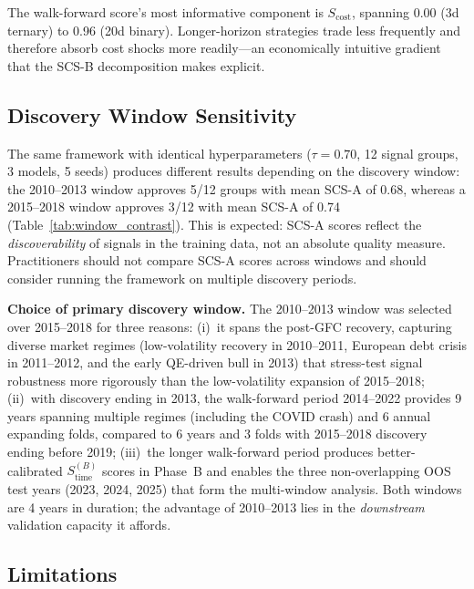 \documentclass[12pt,a4paper]{article}
\begin{document}
The walk-forward score's most informative component is $S_{\text{cost}}$, spanning 0.00 (3d ternary) to 0.96 (20d binary). Longer-horizon strategies trade less frequently and therefore absorb cost shocks more readily---an economically intuitive gradient that the SCS-B decomposition makes explicit.

\subsection{Discovery Window Sensitivity}

The same framework with identical hyperparameters ($\tau=0.70$, 12 signal groups, 3 models, 5 seeds) produces different results depending on the discovery window: the 2010--2013 window approves 5/12 groups with mean SCS-A of 0.68, whereas a 2015--2018 window approves 3/12 with mean SCS-A of 0.74 (Table~\ref{tab:window_contrast}). This is expected: SCS-A scores reflect the \emph{discoverability} of signals in the training data, not an absolute quality measure. Practitioners should not compare SCS-A scores across windows and should consider running the framework on multiple discovery periods.

\textbf{Choice of primary discovery window.} The 2010--2013 window was selected over 2015--2018 for three reasons: (i)~it spans the post-GFC recovery, capturing diverse market regimes (low-volatility recovery in 2010--2011, European debt crisis in 2011--2012, and the early QE-driven bull in 2013) that stress-test signal robustness more rigorously than the low-volatility expansion of 2015--2018; (ii)~with discovery ending in 2013, the walk-forward period 2014--2022 provides 9 years spanning multiple regimes (including the COVID crash) and 6 annual expanding folds, compared to 6 years and 3 folds with 2015--2018 discovery ending before 2019; (iii)~the longer walk-forward period produces better-calibrated $S_{\text{time}}^{(B)}$ scores in Phase~B and enables the three non-overlapping OOS test years (2023, 2024, 2025) that form the multi-window analysis. Both windows are 4 years in duration; the advantage of 2010--2013 lies in the \emph{downstream} validation capacity it affords.

\subsection{Limitations}
\end{document}
